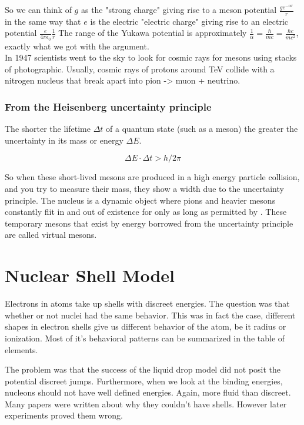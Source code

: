 \documentclass[english, 11pt]{article}
\begin{document}
So we can think of $g$ as the "strong charge" giving rise to a meson potential $\frac{ge^{-\alpha r}}{r}$ in the same way that $e$ is the electric "electric charge" giving rise to an electric potential $\frac{e}{4\pi\epsilon_0}\frac{1}{r}$ The range of the Yukawa potential is approximately $\frac{1}{\alpha} = \frac{\hbar}{mc} = \frac{\hbar c}{mc^2}$, exactly what we got with the  argument.\\
In 1947 scientists went to the sky to look for cosmic rays for mesons using stacks of photographic. Usually, cosmic rays of protons around TeV collide with a nitrogen nucleus that break apart into pion -> muon + neutrino.

\subsubsection{From the Heisenberg uncertainty principle}

The shorter the lifetime $\Delta t$ of a quantum state (such as a meson) the greater the uncertainty in its mass or energy $\Delta E$.

\[ \Delta E \cdot \Delta t > h/2\pi\]

So when these short-lived mesons are produced in a high energy particle collision, and you try to measure their mass, they show a width due to the uncertainty principle.
The nucleus is a dynamic object where pions and heavier mesons constantly flit in and out of existence for only as long as permitted by . These temporary mesons that exist by energy borrowed from the uncertainty principle are called virtual mesons.

\section{Nuclear Shell Model}

Electrons in atoms take up shells with discreet energies. The question was that whether or not nuclei had the same behavior. This was in fact the case, different shapes in electron shells give us different behavior of the atom, be it radius or ionization. Most of it's behavioral patterns can be summarized in the table of elements.

The problem was that the success of the liquid drop model did not posit the potential discreet jumps. Furthermore, when we look at the binding energies, nucleons should not have well defined energies. Again, more fluid than discreet. Many papers were written about why they couldn't have shells. However later experiments proved them wrong.
\end{document}
